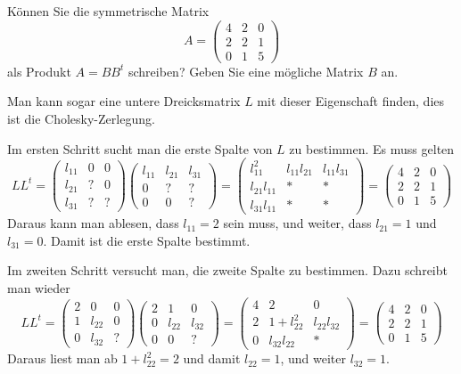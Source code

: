 Können Sie die symmetrische Matrix
\[
A
=
\begin{pmatrix}
4&2&0\\
2&2&1\\
0&1&5
\end{pmatrix}
\]
als Produkt $A=BB^t$ schreiben? Geben Sie eine mögliche
Matrix $B$ an.


\begin{loesung}
Man kann sogar eine untere Dreicksmatrix $L$ mit dieser Eigenschaft
finden, dies ist die Cholesky-Zerlegung.

Im ersten Schritt sucht man die erste Spalte von $L$ zu bestimmen.
Es muss gelten
\[
LL^t=
\begin{pmatrix}
l_{11}&  0&  0\\
l_{21}&  ?&  0\\
l_{31}&  ?&  ?
\end{pmatrix}
\begin{pmatrix}
l_{11}&l_{21}&l_{31}\\
     0&     ?&     ?\\
     0&     0&     ?
\end{pmatrix}
=
\begin{pmatrix}
    l_{11}^2&l_{11}l_{21}&l_{11}l_{31}\\
l_{21}l_{11}&           *&           *\\
l_{31}l_{11}&           *&           *
\end{pmatrix}
=
\begin{pmatrix}
4&2&0\\
2&2&1\\
0&1&5
\end{pmatrix}
\]
Daraus kann man ablesen, dass $l_{11}=2$ sein muss, und weiter,
dass
$l_{21}=1$ und $l_{31}=0$. Damit ist die erste Spalte bestimmt.

Im zweiten Schritt versucht man, die zweite Spalte zu bestimmen.
Dazu schreibt man wieder
\[
LL^t
=
\begin{pmatrix}
2&     0&0\\
1&l_{22}&0\\
0&l_{32}&?
\end{pmatrix}
\begin{pmatrix}
2&     1&     0\\
0&l_{22}&l_{32}\\
0&     0&?
\end{pmatrix}
=
\begin{pmatrix}
4&2           &           0\\
2&1+l_{22}^2  &l_{22}l_{32}\\
0&l_{32}l_{22}&         *
\end{pmatrix}
=
\begin{pmatrix}
4&2&0\\
2&2&1\\
0&1&5
\end{pmatrix}
\]
Daraus liest man ab $1+l_{22}^2=2$ und damit $l_{22}=1$, und weiter
$l_{32}=1$.


\end{loesung}
